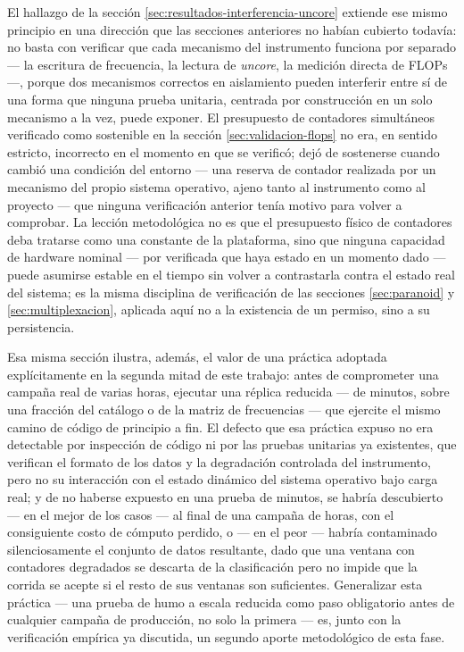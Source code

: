 \documentclass[12pt,oneside,spanish]{book}
\begin{document}
El hallazgo de la sección \ref{sec:resultados-interferencia-uncore} extiende ese mismo principio en una dirección que las secciones anteriores no habían cubierto todavía: no basta con verificar que cada mecanismo del instrumento funciona por separado --- la escritura de frecuencia, la lectura de \textit{uncore}, la medición directa de FLOPs ---, porque dos mecanismos correctos en aislamiento pueden interferir entre sí de una forma que ninguna prueba unitaria, centrada por construcción en un solo mecanismo a la vez, puede exponer. El presupuesto de contadores simultáneos verificado como sostenible en la sección \ref{sec:validacion-flops} no era, en sentido estricto, incorrecto en el momento en que se verificó; dejó de sostenerse cuando cambió una condición del entorno --- una reserva de contador realizada por un mecanismo del propio sistema operativo, ajeno tanto al instrumento como al proyecto --- que ninguna verificación anterior tenía motivo para volver a comprobar. La lección metodológica no es que el presupuesto físico de contadores deba tratarse como una constante de la plataforma, sino que ninguna capacidad de hardware nominal --- por verificada que haya estado en un momento dado --- puede asumirse estable en el tiempo sin volver a contrastarla contra el estado real del sistema; es la misma disciplina de verificación de las secciones \ref{sec:paranoid} y \ref{sec:multiplexacion}, aplicada aquí no a la existencia de un permiso, sino a su persistencia.

Esa misma sección ilustra, además, el valor de una práctica adoptada explícitamente en la segunda mitad de este trabajo: antes de comprometer una campaña real de varias horas, ejecutar una réplica reducida --- de minutos, sobre una fracción del catálogo o de la matriz de frecuencias --- que ejercite el mismo camino de código de principio a fin. El defecto que esa práctica expuso no era detectable por inspección de código ni por las pruebas unitarias ya existentes, que verifican el formato de los datos y la degradación controlada del instrumento, pero no su interacción con el estado dinámico del sistema operativo bajo carga real; y de no haberse expuesto en una prueba de minutos, se habría descubierto --- en el mejor de los casos --- al final de una campaña de horas, con el consiguiente costo de cómputo perdido, o --- en el peor --- habría contaminado silenciosamente el conjunto de datos resultante, dado que una ventana con contadores degradados se descarta de la clasificación pero no impide que la corrida se acepte si el resto de sus ventanas son suficientes. Generalizar esta práctica --- una prueba de humo a escala reducida como paso obligatorio antes de cualquier campaña de producción, no solo la primera --- es, junto con la verificación empírica ya discutida, un segundo aporte metodológico de esta fase.
\end{document}
